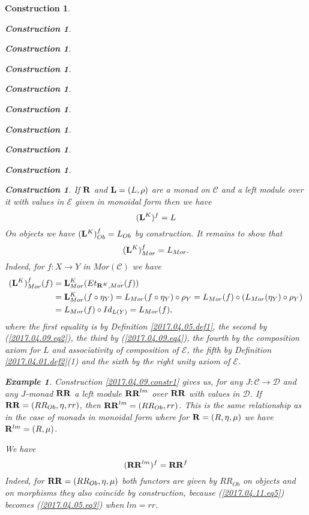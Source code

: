 \documentclass[onecolumn,12pt]{amsart}
\newtheorem{example}[proposition]{Example}
\numberwithin{proposition}{subsection}
\newtheorem{construction}[proposition]{Construction}
\newcommand{\sr}{\rightarrow}
\newcommand{\R}{{\bf R}}
\newcommand{\RR}{{\bf RR}}
\newcommand{\C}{{\mathcal C}}
\newcommand{\D}{{\mathcal D}}
\newcommand{\E}{{\mathcal E}}
\begin{document}
\begin{construction}
\begin{construction}
\begin{construction}
\begin{construction}
\begin{construction}
\begin{construction}
\begin{construction}
\begin{construction}
\begin{construction}
\begin{construction}
If $\R$ and ${\bf L}=(L,\rho)$ are a monad on $\C$ and a left module over it
with values in $\E$ given in monoidal form then we have
%
\begin{equation}
\label{2017.04.17.eq4}
({\bf L}^K)^f=L
\end{equation}%
%
On objects we have $({\bf L}^K)^f_{Ob}=L_{Ob}$ by construction. It remains to
show that
%
\begin{equation}\label{2017.04.09.eq1}
({\bf L}^K)^f_{Mor}=L_{Mor}.
\end{equation}%
%
Indeed, for $f:X\sr Y$ in $Mor(\C)$ we have
%
\begin{equation*}
  \begin{split}
    ({\bf L}^K)^f_{Mor}(f) &= {\bf L}^K_{Mor}(Et_{\R^K,Mor}(f))
    \\
    &= {\bf L}^K_{Mor}(f\circ \eta_Y)=L_{Mor}(f\circ \eta_Y)\circ \rho_Y=L_{Mor}(f)\circ (L_{Mor}(\eta_Y)\circ \rho_Y)
    \\
    &= L_{Mor}(f)\circ Id_{L(Y)}=L_{Mor}(f),
  \end{split}
\end{equation*}
%
where the first equality is by Definition \ref{2017.04.05.def1}, the second by
(\ref{2017.04.09.eq2}), the third by (\ref{2017.04.09.eq4}), the fourth by the
composition axiom for $L$ and associativity of composition of $\E$, the fifth
by Definition \ref{2017.04.01.def2}(1) and the sixth by the right unity axiom
of $\E$.
%
\begin{example}\rm
\label{2017.04.15.ex2}
Construction \ref{2017.04.09.constr1} gives us, for any $J:\C\sr \D$ and any
$J$-monad $\RR$ a left module $\RR^{lm}$ over $\RR$ with values in $\D$.  If
$\RR=(RR_{Ob},\eta,rr)$, then $\RR^{lm}=(RR_{Ob},rr)$. This is the same
relationship as in the case of monads in monoidal form where for
$\R=(R,\eta,\mu)$ we have $\R^{lm}=(R,\mu)$.

We have 
%
$$(\RR^{lm})^f=\RR^f$$
%
Indeed, for $\RR=(RR_{Ob},\eta,\mu)$ both functors are given by $RR_{Ob}$ on
objects and on morphisms they also coincide by construction, because
(\ref{2017.04.11.eq5}) becomes (\ref{2017.04.05.eq3}) when $lm=rr$.


\end{example}
\end{construction}
\end{construction}
\end{construction}
\end{construction}
\end{construction}
\end{construction}
\end{construction}
\end{construction}
\end{construction}
\end{construction}
\end{document}
